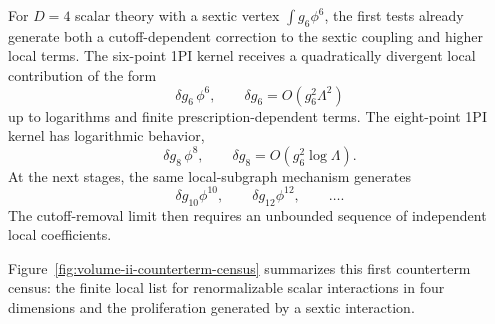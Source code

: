 For \(D=4\) scalar theory with a sextic vertex \(\int g_6\phi^6\), the first
tests already generate both a cutoff-dependent correction to the sextic
coupling and higher local terms.  The six-point 1PI kernel receives a
quadratically divergent local contribution of the form
\[
  \delta g_6\,\phi^6,
  \qquad
  \delta g_6=O(g_6^2\Lambda^2)
\]
up to logarithms and finite prescription-dependent terms.  The eight-point
1PI kernel has logarithmic behavior,
\[
  \delta g_8\,\phi^8,
  \qquad
  \delta g_8=O(g_6^2\log\Lambda).
\]
At the next stages, the same local-subgraph mechanism generates
\[
  \delta g_{10}\phi^{10},\qquad
  \delta g_{12}\phi^{12},\qquad \ldots .
\]
The cutoff-removal limit then requires an unbounded sequence of independent
local coefficients.

Figure~\ref{fig:volume-ii-counterterm-census} summarizes this first counterterm
census: the finite local list for renormalizable scalar interactions in four
dimensions and the proliferation generated by a sextic interaction.


